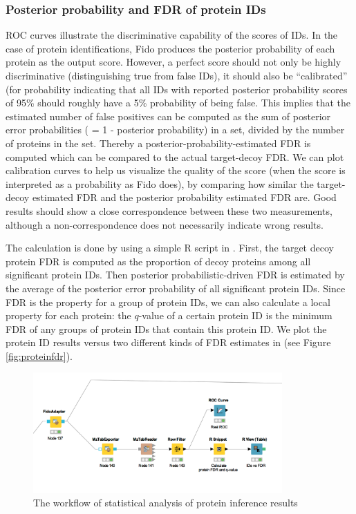 \subsubsection{Posterior probability and FDR of protein IDs}
ROC curves illustrate the discriminative capability of the scores of IDs. 
In the case of protein identifications, Fido produces the posterior probability of each protein as the output score.
However, a perfect score should not only be highly discriminative (distinguishing true from false IDs), 
it should also be ``calibrated'' (for probability indicating that all IDs with reported posterior probability scores 
of 95\% 
should roughly have a 5\% probability of being false. This implies that the estimated number of false positives can 
be computed as the sum
of posterior error probabilities ( = 1 - posterior probability) in a set, divided by the number of proteins in the 
set. Thereby a posterior-probability-estimated FDR is computed which can be compared to the actual target-decoy FDR.
We can plot calibration curves to help us visualize the
quality of the score (when the score is interpreted as a probability as Fido does), by comparing how similar the 
target-decoy estimated FDR and the posterior probability estimated FDR are. Good results should show a close 
correspondence between these two measurements, although a non-correspondence does not necessarily indicate wrong 
results. 

The calculation is done by using a simple R script in . 
First, the target decoy protein FDR is computed as the proportion of decoy proteins among all significant protein 
IDs. 
Then posterior probabilistic-driven FDR is estimated by the average of the posterior error probability of all 
significant protein IDs. Since FDR is the property for a group of protein IDs, we can also calculate a local 
property for each protein: the $q$-value of a certain protein ID is the minimum FDR of any groups of protein IDs that 
contain this protein ID. 
We plot the protein ID results versus two different kinds of FDR estimates in  (see Figure 
\ref{fig:proteinfdr}).

\begin{figure}[htbp]
  \centering
  \includegraphics[width=0.85\textwidth]{graphics/protein_inference/inference_metanode.png}
  \caption{The workflow of statistical analysis of protein inference results}
  \label{fig:proteininference}
\end{figure}

